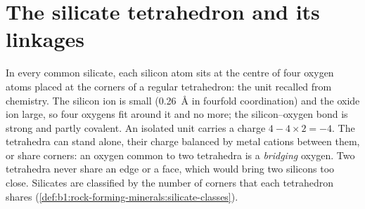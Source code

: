 \section{The silicate tetrahedron and its linkages}

In every common silicate, each silicon atom sits at the centre of four
oxygen atoms placed at the corners of a regular tetrahedron: the
 unit recalled from chemistry. The silicon ion is small
(\qty{0.26}{\angstrom} in fourfold coordination) and the oxide ion large, so
four oxygens fit around it and no more; the silicon--oxygen bond is strong
and partly covalent. An isolated unit carries a charge $4 - 4\times2 = -4$.
The tetrahedra can stand alone, their charge balanced by metal cations
between them, or share corners: an oxygen common to two tetrahedra is a
\emph{bridging} oxygen. Two tetrahedra never share an edge or a face, which
would bring two silicons too close. Silicates are classified by the number of
corners that each tetrahedron shares (\cref{def:b1:rock-forming-minerals:silicate-classes}).

